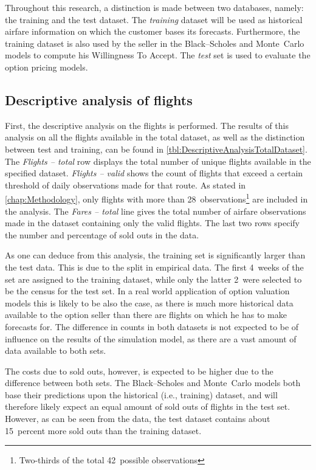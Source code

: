 Throughout this research, a distinction is made between two databases, namely: the training and the test dataset. The \emph{training} dataset will be used as historical airfare information on which the customer bases its forecasts. Furthermore, the training dataset is also used by the seller in the Black--Scholes and Monte~Carlo models to compute his Willingness To Accept. The \emph{test} set is used to evaluate the option pricing models.

\subsection{Descriptive analysis of flights}
First, the descriptive analysis on the flights is performed. The results of this analysis on all the flights available in the total dataset, as well as the distinction between test and training, can be found in \autoref{tbl:DescriptiveAnalysisTotalDataset}. The \emph{Flights -- total} row displays the total number of unique flights available in the specified dataset. \emph{Flights -- valid} shows the count of flights that exceed a certain threshold of daily observations made for that route. As stated in \autoref{chap:Methodology}, only flights with more than 28~observations\footnote{Two-thirds of the total 42~possible observations} are included in the analysis. The \emph{Fares -- total} line gives the total number of airfare observations made in the dataset containing only the valid flights. The last two rows specify the number and percentage of sold outs in the data.

As one can deduce from this analysis, the training set is significantly larger than the test data. This is due to the split in empirical data. The first 4~weeks of the set are assigned to the training dataset, while only the latter 2~were selected to be the census for the test set. In a real world application of option valuation models this is likely to be also the case, as there is much more historical data available to the option seller than there are flights on which he has to make forecasts for. The difference in counts in both datasets is not expected to be of influence on the results of the simulation model, as there are a vast amount of data available to both sets.

The costs due to sold outs, however, is expected to be higher due to the difference between both sets. The Black--Scholes and Monte~Carlo models both base their predictions upon the historical (i.e., training) dataset, and will therefore likely expect an equal amount of sold outs of flights in the test set. However, as can be seen from the data, the test dataset contains about 15~percent more sold outs than the training dataset.

